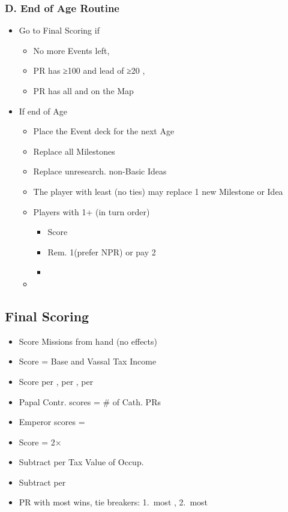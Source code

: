\documentclass[10pt]{article}
\begin{document}
\subsubsection*{D. End of Age Routine}
\begin{itemize}
	\item Go to Final Scoring if
	\begin{itemize}
		\item No more Events left, 
		\item PR has ≥100 \prestige and lead of ≥20 \prestige, 
		\item PR has all \towns and \vassals on the Map
	\end{itemize}
	\item If end of Age
	\begin{itemize}
		\item Place the Event deck for the next Age
		\item Replace all Milestones
		\item Replace unresearch. non-Basic Ideas
		\item The player with least \prestige (no ties) may replace 1 new Milestone or Idea
		\item Players with 1+ \marriage (in turn order)
		\begin{itemize}
			\item Score 
			\item Rem. 1\marriage (prefer NPR) or pay 2\diplopower
			\item {}
		\end{itemize}
		\item {}
	\end{itemize}
\end{itemize}

\subsection*{Final Scoring}
\begin{itemize}
	\item Score Missions from hand (no effects)
	\item Score \prestige = Base and Vassal Tax Income
	\item Score  per \core,  per \marriage,  per \alliance
	\item Papal Contr. scores \prestige = \# of Cath. PRs
	\item Emperor scores \prestige = \authority
	\item Score \prestige = 2× \stability
	\item Subtract  per Tax Value of Occup. \towns
	\item Subtract  per \interest
	\item PR with most \prestige wins, tie breakers: 1.~most \monarchpower, 2.~most \ducats%
\end{itemize}
\end{document}
